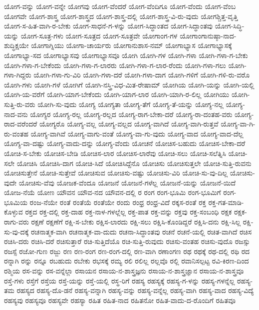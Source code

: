 {ಯೋಗ-ವನ್ನು
ಯೋಗ-ವನ್ನೇ
ಯೋಗವು
ಯೋಗ-ವೆಂದರೆ
ಯೋಗ-ವೆಂದಿಗೂ
ಯೋಗ-ವೆಂದು
ಯೋಗ-ವೆಂಬ
ಯೋಗವೇ
ಯೋಗ-ಶಾಸ್ತ್ರ
ಯೋಗ-ಶಾಸ್ತ್ರದ
ಯೋಗ-ಶಾಸ್ತ್ರ-ದಲ್ಲಿ
ಯೋಗ-ಶಾಸ್ತ್ರ-ವಿ-ರು-ವುದು
ಯೋಗಶ್ಚಿತ್ತ-ವೃತ್ತಿ
ಯೋಗ-ಸ-ಹಿತ-ವಾಗಿ-ರ-ಬೇಕು
ಯೋಗ-ಸಾಧನೆ-ಗ-ಳನ್ನು
ಯೋಗ-ಸಿದ್ಧಾಂತದ
ಯೋಗ-ಸಿದ್ಧಾಂತವು
ಯೋಗ-ಸಿದ್ಧಿ-ಯನ್ನು
ಯೋಗ-ಸೂತ್ರ-ಗಳು
ಯೋಗ-ಸೂತ್ರದ
ಯೋಗ-ಸೂತ್ರವೇ
ಯೋಗಾಂಗ-ಗಳ
ಯೋಗಾಂಗಾನುಷ್ಠಾ-ನಾದ-ಶುದ್ಧಿಕ್ಷಯೇ
ಯೋಗಾಗ್ನಿಯು
ಯೋಗಾ-ಚಾರ್ಯರು
ಯೋಗಾನುಶಾಸ-ನಮ್
ಯೋಗಾಭ್ಯಾಸ
ಯೋಗಾಭ್ಯಾಸಕ್ಕೆ
ಯೋಗಾಭ್ಯಾ-ಸದ
ಯೋಗಾಭ್ಯಾಸವು
ಯೋಗಾಭ್ಯಾಸವೂ
ಯೋಗಿ
ಯೋಗಿ-ಗಳ
ಯೋಗಿ-ಗಳಾ
ಯೋಗಿ-ಗಳಾ-ಗ-ಬೇಕು
ಯೋಗಿ-ಗಳಾ-ಗ-ಬೇಕೆಂದು
ಯೋಗಿ-ಗಳಾ-ಗ-ಲಾರರು
ಯೋಗಿ-ಗಳಾ-ಗ-ಲಾರ-ರೆಂದು
ಯೋಗಿ-ಗಳಾ-ಗಲು
ಯೋಗಿ-ಗಳಾ-ಗಿದ್ದರು
ಯೋಗಿ-ಗಳಾ-ಗು-ವಿರಿ
ಯೋಗಿ-ಗಳಾ-ದರೆ
ಯೋಗಿ-ಗಳಾ-ದಾಗ
ಯೋಗಿ-ಗಳಿಗೆ
ಯೋಗಿ-ಗಳಿ-ರು-ವರೊ
ಯೋಗಿ-ಗಳು
ಯೋಗಿ-ಗಳೆ
ಯೋಗಿಗೆ
ಯೋಗಿ-ನಸ್ತ್ರಿ-ವಿಧ-ಮಿತ-ರೇಷಾಮ್
ಯೋಗಿಯ
ಯೋಗಿ-ಯನ್ನು
ಯೋಗಿ-ಯಲ್ಲಿ
ಯೋಗಿ-ಯ-ವರೆಗೆ
ಯೋಗಿ-ಯಾಗ-ಬೇಕೆಂದು
ಯೋಗಿ-ಯಾಗ-ಲಾರ
ಯೋಗಿ-ಯಾಗಿ-ರ-ಲಿಲ್ಲ
ಯೋಗಿಯು
ಯೋಗಿ-ಸುತ್ತಿ-ರು-ವರು
ಯೋಗಿ-ಸು-ವುದು
ಯೋಗ್ಯ
ಯೋಗ್ಯತಾ
ಯೋಗ್ಯ-ತೆಗೆ
ಯೋಗ್ಯ-ತೆ-ಯನ್ನು
ಯೋಗ್ಯ-ನಲ್ಲ
ಯೋಗ್ಯ-ನಾದ-ವನು
ಯೋಗ್ಯರ
ಯೋಗ್ಯ-ರಲ್ಲ
ಯೋಗ್ಯ-ರಲ್ಲದ
ಯೋಗ್ಯ-ರಾಗ-ಬೇಕಾ-ದರೆ
ಯೋಗ್ಯ-ರಾ-ದಂತಹ-ವರು
ಯೋಗ್ಯ-ರಾದ-ವರೆಂದರೆ
ಯೋಗ್ಯರೊ
ಯೋಗ್ಯ-ವಲ್ಲ
ಯೋಗ್ಯ-ವಲ್ಲದ
ಯೋಗ್ಯ-ವಾಗಿದೆ
ಯೋಗ್ಯ-ವಾಗಿ-ರುತ್ತವೆ
ಯೋಗ್ಯ-ವಾ-ಗಿ-ರು-ವಂತಹ
ಯೋಗ್ಯ-ವಾಗಿವೆ
ಯೋಗ್ಯ-ವಾಗು-ವಂತೆ
ಯೋಗ್ಯ-ವಾ-ಗು-ವುದು
ಯೋಗ್ಯ-ವಾದ
ಯೋಗ್ಯ-ವಾದ-ದೆಲ್ಲ
ಯೋಗ್ಯ-ವಾ-ದಷ್ಟು
ಯೋಗ್ಯ-ವಾದು-ದನ್ನು
ಯೋಗ್ಯ-ವೆಂದು
ಯೋಚನೆ
ಯೋಚಿಸ-ಬಹುದು
ಯೋಚಿಸ-ಬೇಕಾ-ದರೆ
ಯೋಚಿ-ಸ-ಬೇಕು
ಯೋಚಿಸ-ಬೇಡಿ
ಯೋಚಿಸ-ಲಾರ
ಯೋಚಿಸ-ಲಾರೆವು
ಯೋಚಿ-ಸಲು
ಯೋಚಿ-ಸಲೆತ್ನಿಸಿ
ಯೋಚಿ-ಸಲೇ
ಯೋಚಿಸಿ
ಯೋಚಿಸಿ-ದಾಗ
ಯೋಚಿ-ಸಿದೆ
ಯೋಚಿಸಿದ್ದೆನೊ
ಯೋಚಿಸು
ಯೋಚಿಸುತ್ತಲೇ
ಯೋಚಿ-ಸುತ್ತಿ-ರುವನು
ಯೋಚಿಸುತ್ತೇನೆ
ಯೋಚಿ-ಸುತ್ತೇವೆ
ಯೋಚಿಸುವ
ಯೋಚಿಸು-ವಷ್ಟು
ಯೋಚಿಸು-ವಿರಿ
ಯೋಚಿ-ಸು-ವು-ದಿಲ್ಲ
ಯೋಚಿಸು-ವುದೇ
ಯೋಚಿಸು-ವೆವು
ಯೋಜಕ-ವೆಂದೂ
ಯೋಜನೆ
ಯೋಜನೆ-ಗಳೆಲ್ಲ
ಯೋಜನೆ-ಯನ್ನು
ಯೋಜನೆ-ಯಿದೆ
ಯೋಜ-ನೆಯೆ
ಯೋಣ
ಯೌವನ
ಯೌವ-ನದ
ಯೌವನ-ದಲ್ಲಿ
ರ
ರಂಗ
ರಂಗ-ಭೂಮಿ
ರಂಗ-ಭೂಮಿಗೆ
ರಂಗ-ಭೂಮಿಯ
ರಂಜ-ನೆಯೇ
ರಂತೆ
ರಂತೆಯೆ
ರಂತೆಯೇ
ರಂದು
ರಂಧ್ರ
ರಂಧ್ರ-ವಿದೆ
ರಕ್ಕಸ-ರಂತೆ
ರಕ್ತ
ರಕ್ತ-ಗತ-ಮಾಡಿ-ಕೊಳ್ಳುವ
ರಕ್ತದ
ರಕ್ತ-ದಲ್ಲಿ
ರಕ್ತ-ದಾಹ
ರಕ್ತ-ನಾಳ-ಗಳಲ್ಲೆಲ್ಲ
ರಕ್ತ-ಪಾತ
ರಕ್ತ-ವನ್ನು
ರಕ್ತವು
ರಕ್ತ-ಸಂಬಂಧಿ
ರಕ್ಷಕ
ರಕ್ಷಕ-ರಾಗು-ವರು
ರಕ್ಷಣೆ
ರಕ್ಷಣೆಗೆ
ರಕ್ಷಿ-ಸ-ಬೇಕು
ರಕ್ಷಿಸ-ಲಾರದು
ರಕ್ಷಿ-ಸಲು
ರಕ್ಷಿಸಿ-ಕೊಂಡಿದ್ದರೆ
ರಕ್ಷಿಸಿ-ದನು
ರಕ್ಷಿ-ಸಿಲ್ಲ
ರಕ್ಷಿ-ಸು-ವು-ದಕ್ಕೆ
ರಚನಾತ್ಮಕ-ವಾಗಿ
ರಚನಾತ್ಮಕ-ವಾ-ದುದು
ರಚನಾ-ಸಿದ್ಧಾಂತವು
ರಚನೆ
ರಚನೆ-ಯಲ್ಲಿ
ರಚಿತ-ವಾಗಿದೆ
ರಚಿಸ
ರಚಿಸಿ-ದರು
ರಚಿಸಿ-ದರೆ
ರಚಿಸುತ್ತಾರೆ
ರಚಿ-ಸುತ್ತಿದೆಯೊ
ರಚಿ-ಸುತ್ತಿ-ರುವುದು
ರಚಿಸು-ವಂತಹ
ರಚಿಸು-ವುದೊ
ರಜಸ್ಸು
ರಜಸ್ಸೆ
ರಜೋ-ಗುಣ
ರಜ್ಜು
ರಣ
ರಣ-ರಂಗ
ರಣ-ರಂಗ-ದಲ್ಲಿ
ರಣ-ವಾಗಿ
ರಣಾಂಗಣ
ರಥ
ರಥಕ್ಕೆ
ರಥ-ದಲ್ಲಿ
ರಥಿ
ರದ
ರನ್ನಾಗಿ
ರನ್ನು
ರನ್ನೂ
ರಬಹುದು
ರಬೇಕು
ರಭಸಕ್ಕೆ
ರಮ್ಯ
ರಲಿ
ರಲಿಲ್ಲ
ರಲ್ಲವೊ
ರಲ್ಲಿ
ರವಾನಿಸಲ್ಪಟ್ಟ
ರವಿ-ಕಿರಣ-ದಿಂದ
ರಶ್ಮಿಯ
ರಸ-ವನ್ನು
ರಸ-ವನ್ನೆಲ್ಲಾ
ರಸಾಯನ
ರಸಾಯ-ನ-ಶಾಸ್ತ್ರಜ್ಞನು
ರಸಾಯ-ನ-ಶಾಸ್ತ್ರಜ್ಞಾನ
ರಸಾಯ-ನ-ಶಾಸ್ತ್ರವೂ
ರಸ್ತೆ-ಗಳು
ರಸ್ತೆಗೆ
ರಸ್ತೆಯ
ರಸ್ತೆ-ಯನ್ನು
ರಸ್ತೆ-ಯಲ್ಲಿ
ರಸ್ಥ-ರಿಗೆ
ರಹಸ್ಯ
ರಹಸ್ಯಕ್ಕೆ
ರಹಸ್ಯ-ಗ-ಳನ್ನು
ರಹಸ್ಯ-ಗಳನ್ನೆಲ್ಲ
ರಹಸ್ಯ-ತಮ
ರಹಸ್ಯದ
ರಹಸ್ಯ-ದೊ-ಡನೆ
ರಹಸ್ಯ-ವನ್ನಾಗಿ
ರಹಸ್ಯ-ವನ್ನು
ರಹಸ್ಯ-ವನ್ನೆಲ್ಲ
ರಹಸ್ಯ-ವಾಗಿ
ರಹಸ್ಯ-ವಾದ
ರಹಸ್ಯ-ವಿದ್ಯೆ
ರಹಸ್ಯವು
ರಹಸ್ಯವೂ
ರಹಸ್ಯವೇ
ರಹಸ್ಯಾ
ರಹಿತ
ರಹಿತ-ನಾದ
ರಹಿತನೋ
ರಹಿತ-ವಾದು-ದ-ರೊಂದಿಗೆ
ರಹಿತವೂ
}
